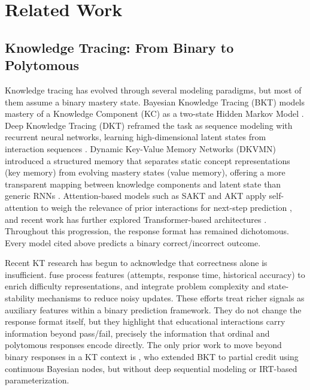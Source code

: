 \documentclass[pdflatex,sn-apa]{sn-jnl}
\begin{document}
\section{Related Work}
\subsection{Knowledge Tracing: From Binary to Polytomous}
Knowledge tracing has evolved through several modeling paradigms, but most of them assume a binary mastery state. Bayesian Knowledge Tracing (BKT) models mastery of a Knowledge Component (KC) as a two-state Hidden Markov Model \citep{corbett_knowledge_1994}. Deep Knowledge Tracing (DKT) reframed the task as sequence modeling with recurrent neural networks, learning high-dimensional latent states from interaction sequences \citep{piech_deep_2015}. Dynamic Key-Value Memory Networks (DKVMN) introduced a structured memory that separates static concept representations (key memory) from evolving mastery states (value memory), offering a more transparent mapping between knowledge components and latent state than generic RNNs \citep{graves_hybrid_2016, zhang_dynamic_2017}. Attention-based models such as SAKT and AKT apply self-attention to weigh the relevance of prior interactions for next-step prediction \citep{pandey_self-attentive_2019, ghosh_context-aware_2020}, and recent work has further explored Transformer-based architectures \citep{choi_saint_2020, liu_simplekt_2023}. Throughout this progression, the response format has remained dichotomous. Every model cited above predicts a binary correct/incorrect outcome.

Recent KT research has begun to acknowledge that correctness alone is insufficient. \citet{lu_selfkt_2024} fuse process features (attempts, response time, historical accuracy) to enrich difficulty representations, and \citet{li_pskt_2025} integrate problem complexity and state-stability mechanisms to reduce noisy updates. These efforts treat richer signals as auxiliary features within a binary prediction framework. They do not change the response format itself, but they highlight that educational interactions carry information beyond pass/fail, precisely the information that ordinal and polytomous responses encode directly. The only prior work to move beyond binary responses in a KT context is \citet{wang_extending_2013}, who extended BKT to partial credit using continuous Bayesian nodes, but without deep sequential modeling or IRT-based parameterization.
\end{document}
